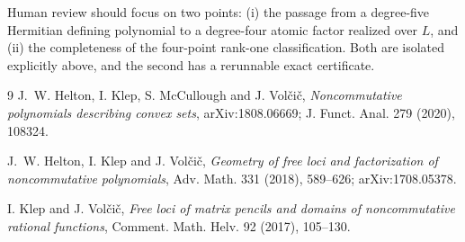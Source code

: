 \documentclass[11pt]{article}
\begin{document}
Human review should focus on two points: (i) the passage from a degree-five Hermitian defining polynomial to a degree-four atomic factor realized over $L$, and (ii) the completeness of the four-point rank-one classification.  Both are isolated explicitly above, and the second has a rerunnable exact certificate.

\begin{thebibliography}{9}
J.~W. Helton, I. Klep, S. McCullough and J. Vol\v{c}i\v{c},
\emph{Noncommutative polynomials describing convex sets},
arXiv:1808.06669; J. Funct. Anal. 279 (2020), 108324.

J.~W. Helton, I. Klep and J. Vol\v{c}i\v{c},
\emph{Geometry of free loci and factorization of noncommutative polynomials},
Adv. Math. 331 (2018), 589--626; arXiv:1708.05378.

I. Klep and J. Vol\v{c}i\v{c},
\emph{Free loci of matrix pencils and domains of noncommutative rational functions},
Comment. Math. Helv. 92 (2017), 105--130.
\end{thebibliography}
\end{document}
